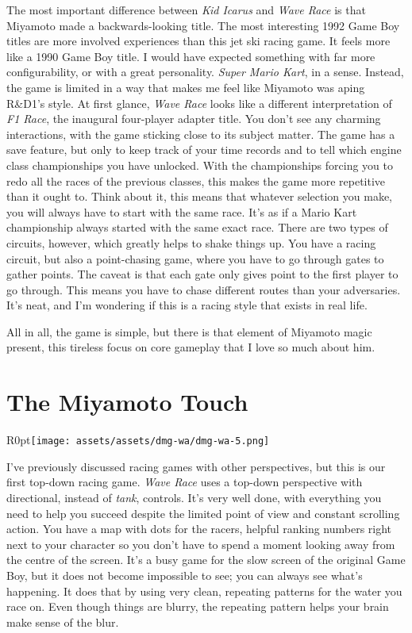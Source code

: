 \documentclass{book}
\begin{document}
The most important difference between \emph{Kid Icarus} and \emph{Wave Race} is that Miyamoto made a backwards-looking title. The most interesting 1992 Game Boy titles are more involved experiences than this jet ski racing game. It feels more like a 1990 Game Boy title. I would have expected something with far more configurability, or with a great personality. \emph{Super Mario Kart}, in a sense. Instead, the game is limited in a way that makes me feel like Miyamoto was aping R\&D1’s style. At first glance, \emph{Wave Race} looks like a different interpretation of \emph{F1 Race}, the inaugural four-player adapter title. You don’t see any charming interactions, with the game sticking close to its subject matter. The game has a save feature, but only to keep track of your time records and to tell which engine class championships you have unlocked. With the championships forcing you to redo all the races of the previous classes, this makes the game more repetitive than it ought to. Think about it, this means that whatever selection you make, you will always have to start with the same race. It’s as if a Mario Kart championship always started with the same exact race. There are two types of circuits, however, which greatly helps to shake things up. You have a racing circuit, but also a point-chasing game, where you have to go through gates to gather points. The caveat is that each gate only gives point to the first player to go through. This means you have to chase different routes than your adversaries. It’s neat, and I’m wondering if this is a racing style that exists in real life.\par
All in all, the game is simple, but there is that element of Miyamoto magic present, this tireless focus on core gameplay that I love so much about him.\par
\FloatBarrier\section*{The Miyamoto Touch}
\begin{wrapfigure}{R}{0pt}{\texttt{[image: assets/assets/dmg-wa/dmg-wa-5.png]}}\end{wrapfigure}
I’ve previously discussed racing games with other perspectives, but this is our first top-down racing game. \emph{Wave Race} uses a top-down perspective with directional, instead of \emph{tank}, controls. It’s very well done, with everything you need to help you succeed despite the limited point of view and constant scrolling action. You have a map with dots for the racers, helpful ranking numbers right next to your character so you don’t have to spend a moment looking away from the centre of the screen. It’s a busy game for the slow screen of the original Game Boy, but it does not become impossible to see; you can always see what’s happening. It does that by using very clean, repeating patterns for the water you race on. Even though things are blurry, the repeating pattern helps your brain make sense of the blur.\par
\end{document}
